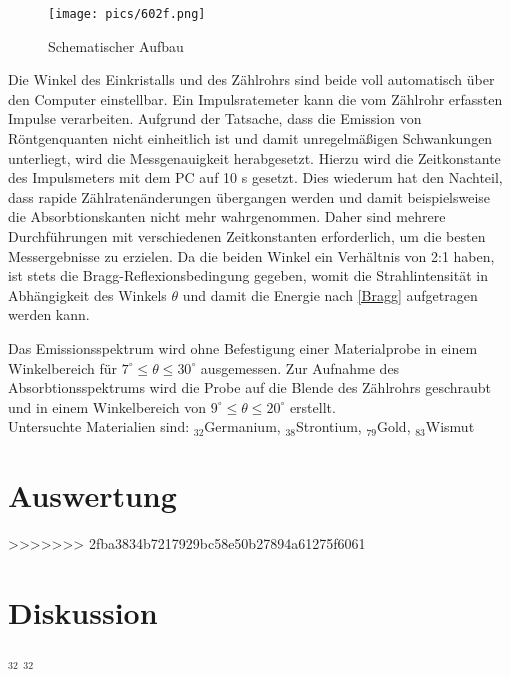 \begin{figure}[H]
\texttt{[image: pics/602f.png]}
\centering
\caption{Schematischer Aufbau}
\label{Aufbau}
\end{figure}


Die Winkel des Einkristalls und des Zählrohrs sind beide voll automatisch über den Computer einstellbar. Ein Impulsratemeter
kann die vom Zählrohr erfassten Impulse verarbeiten. Aufgrund der Tatsache, dass die Emission von Röntgenquanten nicht
einheitlich ist und damit unregelmäßigen Schwankungen unterliegt, wird die Messgenauigkeit herabgesetzt. Hierzu wird die
Zeitkonstante des Impulsmeters mit dem PC auf 10 s gesetzt. Dies wiederum hat den Nachteil, dass rapide Zählratenänderungen
übergangen werden und damit beispielsweise die Absorbtionskanten nicht mehr wahrgenommen. Daher sind mehrere Durchführungen
mit verschiedenen Zeitkonstanten erforderlich, um die besten Messergebnisse zu erzielen. Da die beiden Winkel ein Verhältnis
von 2:1 haben, ist stets die Bragg-Reflexionsbedingung gegeben, womit die Strahlintensität in Abhängigkeit des Winkels
$\theta$ und damit die Energie nach \eqref{Bragg} aufgetragen werden kann. 

Das Emissionsspektrum wird ohne Befestigung einer Materialprobe in einem Winkelbereich für $7^\circ \le \theta \le 30^\circ$ ausgemessen.
Zur Aufnahme des Absorbtionsspektrums wird die Probe auf die Blende des Zählrohrs geschraubt und in einem Winkelbereich von
$9^\circ \le \theta \le 20^\circ$ erstellt.\\
Untersuchte Materialien sind: $_{32}$Germanium, $_{38}$Strontium, $_{79}$Gold, $_{83}$Wismut

\section{Auswertung}

>>>>>>> 2fba3834b7217929bc58e50b27894a61275f6061
\section{Diskussion}

$_{32}$
$_{32}$


